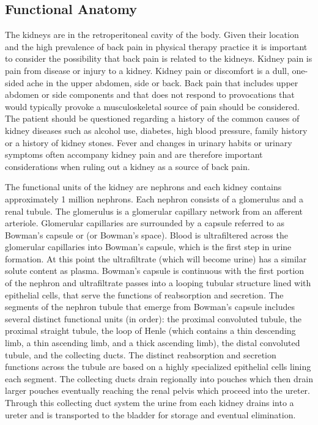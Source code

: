 \subsection{Functional Anatomy}

The kidneys are in the retroperitoneal cavity of the body.  Given their location and the high prevalence of back pain in physical therapy practice it is important to consider the possibility that back pain is related to the kidneys. Kidney pain is pain from disease or injury to a kidney. Kidney pain or discomfort is a dull, one-sided ache in the upper abdomen, side or back. Back pain that includes upper abdomen or side components and that does not respond to provocations that would typically provoke a musculoskeletal source of pain should be considered. The patient should be questioned regarding a history of the common causes of kidney diseases such as alcohol use, diabetes, high blood pressure, family history or a history of kidney stones. Fever and changes in urinary habits or urinary symptoms often accompany kidney pain and are therefore important considerations when ruling out a kidney as a source of back pain.

The functional units of the kidney are nephrons and each kidney contains approximately 1 million nephrons. Each nephron consists of a glomerulus and a renal tubule. The glomerulus is a glomerular capillary network from an afferent arteriole. Glomerular capillaries are surrounded by a capsule referred to as Bowman’s capsule or (or Bowman’s space).  Blood is ultrafiltered across the glomerular capillaries into Bowman’s capsule, which is the first step in urine formation. At this point the ultrafiltrate (which will become urine) has a similar solute content as plasma. Bowman’s capsule is continuous with the first portion of the nephron and ultrafiltrate passes into a looping tubular structure lined with epithelial cells, that serve the functions of reabsorption and secretion. 
The segments of the nephron tubule that emerge from Bowman’s capsule includes several distinct functional units (in order): the proximal convoluted tubule, the proximal straight tubule, the loop of Henle (which contains a thin descending limb, a thin ascending limb, and a thick ascending limb), the distal convoluted tubule, and the collecting ducts. The distinct reabsorption and secretion functions across the tubule are based on a highly specialized epithelial cells lining each segment. The collecting ducts drain regionally into pouches which then drain larger pouches eventually reaching the renal pelvis which proceed into the ureter. Through this collecting duct system the urine from each kidney drains into a ureter and is transported to the bladder for storage and eventual elimination.


